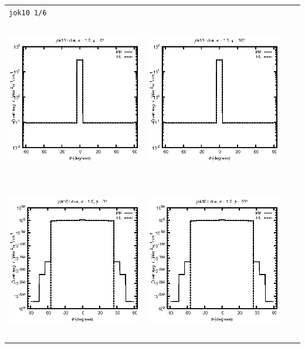 \begin{tabular}{c c c c}
\multicolumn{4}{l}{\texttt{jok10 1/6}} \\
\includegraphics[height=7cm]{../eps/jok10_Ld_a_fwd.eps} &
\includegraphics[height=7cm]{../eps/jok10_Ld_a_cross.eps}\\
\includegraphics[height=7cm]{../eps/jok10_Ld_w_fwd.eps} &
\includegraphics[height=7cm]{../eps/jok10_Ld_w_cross.eps} \\

\end{tabular}
